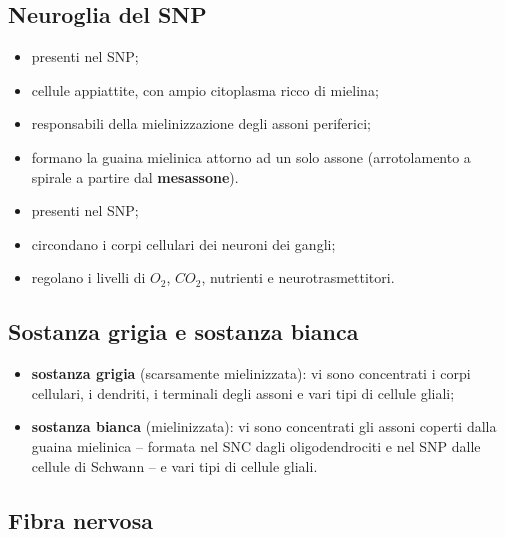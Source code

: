 \subsection{Neuroglia del SNP}

\begin{itemize}
  \item presenti nel SNP;
  \item cellule appiattite, con ampio citoplasma ricco di mielina;
  \item responsabili della mielinizzazione degli assoni periferici;
  \item formano la guaina mielinica attorno ad un solo assone (arrotolamento a spirale a partire dal \textbf{mesassone}).
\end{itemize}

\begin{itemize}
  \item presenti nel SNP;
  \item circondano i corpi cellulari dei neuroni dei gangli;
  \item regolano i livelli di $O_2$, $CO_2$, nutrienti e neurotrasmettitori.
\end{itemize}

\subsection{Sostanza grigia e sostanza bianca}

\begin{itemize}
  \item \textbf{sostanza grigia} (scarsamente mielinizzata): vi sono concentrati i corpi cellulari, i dendriti, i terminali degli assoni e vari tipi di cellule gliali;
  \item \textbf{sostanza bianca} (mielinizzata): vi sono concentrati gli assoni coperti dalla guaina mielinica -- formata nel SNC dagli oligodendrociti e nel SNP dalle cellule di Schwann -- e vari tipi di cellule gliali.
\end{itemize}

\subsection{Fibra nervosa}

